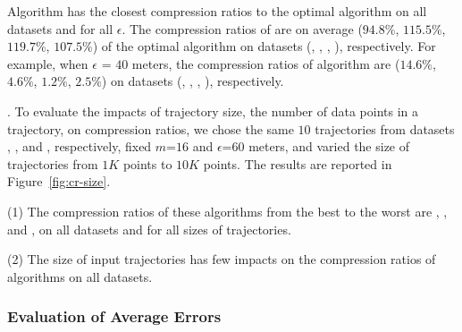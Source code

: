 {{ Algorithm \cista has the closest compression ratios to the optimal algorithm on all datasets and for all $\epsilon$.
The compression ratios of \cista are on average  ($94.8\%$, $115.5\%$, $119.7\%$, $107.5\%$)} of the optimal algorithm
 on {datasets (\sercar, \geolife, \mopsi, \pricar)}, respectively.
For example, when $\epsilon$ = $40$ meters, the compression ratios of algorithm
\cista are ($14.6\%$, $4.6\%$, $1.2\%$, $2.5\%$) on datasets (\sercar, \geolife, \mopsi, \pricar), respectively.

.
To evaluate the impacts of trajectory size, \ie the number of data points in a trajectory, on compression ratios,
we chose the same {$10$} trajectories from datasets \sercar, \geolife, \mopsi and \pricar, respectively,
fixed {$m$=$16$} and $\epsilon$=$60$ meters, and varied the size  of trajectories from $1K$ points to $10K$ points.
%
The results are reported in Figure~\ref{fig:cr-size}.

\ni(1) The compression ratios of these algorithms from the best to the worst are \cista, \dps, \cist and \squishe, on all datasets and for all sizes of trajectories.

\ni(2) The size of input trajectories has few impacts on the compression ratios of \lsa algorithms on all datasets.





\subsubsection{Evaluation of Average Errors}



}
